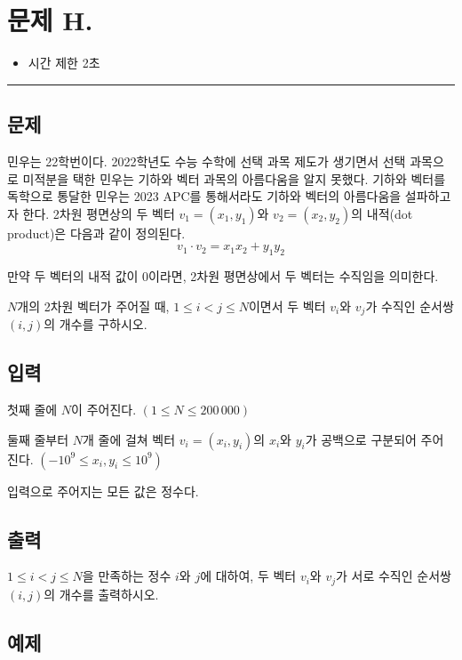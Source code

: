 \newpage
\section*{{\Large 문제 H.} }

\begin{itemize}
    \item 시간 제한 \tabto{2cm} 2초
\end{itemize}

\hrule

\subsection*{문제}

민우는 22학번이다. 2022학년도 수능 수학에 선택 과목 제도가 생기면서 선택 과목으로 미적분을 택한 민우는 기하와 벡터 과목의 아름다움을 알지 못했다. 기하와 벡터를 독학으로 통달한 민우는 2023 APC를 통해서라도 기하와 벡터의 아름다움을 설파하고자 한다. 2차원 평면상의 두 벡터 $v_{1}=\left( x_{1},y_{1} \right)$와 $v_{2}=\left( x_{2},y_{2} \right)$의 내적(dot product)은 다음과 같이 정의된다.
$$v_{1}\cdot v_{2}=x_{1}x_{2}+y_{1}y_{2}$$

만약 두 벡터의 내적 값이 $0$이라면, 2차원 평면상에서 두 벡터는 수직임을 의미한다.

$N$개의 2차원 벡터가 주어질 때, $1\leq i<j\leq N$이면서 두 벡터 $v_{i}$와 $v_{j}$가 수직인 순서쌍 $(i,j)$의 개수를 구하시오.

\subsection*{입력}

첫째 줄에 $N$이 주어진다. $(1\leq N \leq 200\,000)$

둘째 줄부터 $N$개 줄에 걸쳐 벡터 $v_{i}=\left(x_{i},y_{i}\right)$의 $x_{i}$와 $y_{i}$가 공백으로 구분되어 주어진다. $(-10^{9}\leq x_{i},y_{i} \leq 10^{9})$

입력으로 주어지는 모든 값은 정수다.

\subsection*{출력}

$1\leq i < j \leq N$을 만족하는 정수 $i$와 $j$에 대하여, 두 벡터 $v_{i}$와 $v_{j}$가 서로 수직인 순서쌍 $(i,j)$의 개수를 출력하시오.

\subsection*{예제}

